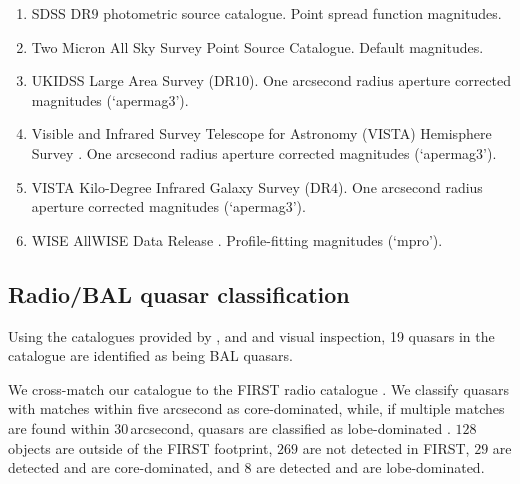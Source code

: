 \begin{enumerate}

 \item SDSS DR$9$ \citep{ahn12} photometric source catalogue. Point spread function magnitudes. 

 \item Two Micron All Sky Survey \citep[$2$MASS;][]{skrutskie06} Point Source Catalogue. Default magnitudes.

 \item UKIDSS Large Area Survey (DR$10$). One arcsecond radius aperture corrected magnitudes (`apermag$3$').   

 \item Visible and Infrared Survey Telescope for Astronomy (VISTA) Hemisphere Survey \citep[VHS;][]{mcmahon13}. One arcsecond radius aperture corrected magnitudes (`apermag$3$').   

 \item VISTA Kilo-Degree Infrared Galaxy \citep[VIKING;][]{edge13} Survey (DR$4$). One arcsecond radius aperture corrected magnitudes (`apermag$3$').

 \item WISE AllWISE Data Release \citep{mainzer11}. Profile-fitting magnitudes (`mpro').

\end{enumerate}

\subsection{Radio/BAL quasar classification}
\label{sec:ch2-flags}

Using the catalogues provided by \citet{shen11}, \citet{allen11} and \citet{paris17} and visual inspection, 19 quasars in the catalogue are identified as being  BAL quasars.  

We cross-match our catalogue to the FIRST radio catalogue \citep{white97}. 
We classify quasars with matches within five arcsecond as core-dominated, while, if multiple matches are found within $30$\,arcsecond, quasars are classified as lobe-dominated \citep[e.g.][]{shen11}. 
$128$ objects are outside of the FIRST footprint, $269$ are not detected in FIRST, $29$ are detected and are core-dominated, and $8$ are detected and are lobe-dominated. 

